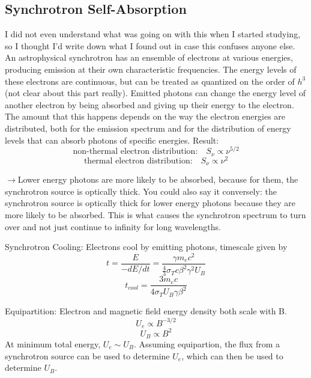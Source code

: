 \subsection{Synchrotron Self-Absorption}
	I did not even understand what was going on with this when I started studying, so I thought I'd write down what I found out in case this confuses anyone else.
	An astrophysical synchrotron has an ensemble of electrons at various energies, producing emission at their own characteristic frequencies. The energy levels of these electrons are continuous, but can be treated as quantized on the order of $h^{3}$ (not clear about this part really). Emitted photons can change the energy level of another electron by being absorbed and giving up their energy to the electron.
	The amount that this happens depends on the way the electron energies are distributed, both for the emission spectrum and for the distribution of energy levels that can absorb photons of specific energies.
	Result:
	\begin{equation}
	\text{non-thermal electron distribution:} \quad S_{\nu} \propto \nu^{5/2}		
	\end{equation}
	\begin{equation}
	\text{thermal electron distribution:} \quad S_{\nu} \propto \nu^{2}		
	\end{equation}
	
	$\rightarrow$Lower energy photons are more likely to be absorbed, because for them, the synchrotron source is optically thick. You could also say it conversely: the synchrotron source is optically thick for lower energy photons because they are more likely to be absorbed. This is what causes the synchrotron spectrum to turn over and not just continue to infinity for long wavelengths.

Synchrotron Cooling:
Electrons cool by emitting photons, timescale given by
\begin{displaymath}t=\frac{E}{-dE/dt}=\frac{\gamma m_ec^2}{\frac{4}{3}\sigma_Tc\beta^2\gamma^2U_B}\end{displaymath}
\begin{displaymath}\boxed{t_{cool}=\frac{3m_ec}{4\sigma_TU_B\gamma \beta^2}}\end{displaymath}

Equipartition:
Electron and magnetic field energy density both scale with B.
\begin{displaymath}U_e\propto B^{-3/2}\end{displaymath}
\begin{displaymath}U_B\propto B^2\end{displaymath}
At minimum total energy, $U_e\sim U_B$.  Assuming equipartion, the flux from a synchrotron source 
can be used to determine $U_e$, which can then be used to determine $U_B$.

